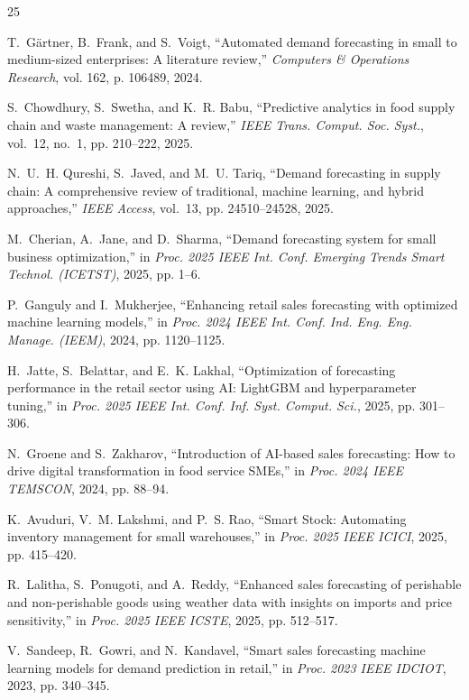 \documentclass[conference]{IEEEtran}
\begin{document}
\begin{thebibliography}{25}

T.~G{\"a}rtner, B.~Frank, and S.~Voigt, ``Automated demand forecasting in small to medium-sized enterprises: A literature review,'' \emph{Computers \& Operations Research}, vol. 162, p. 106489, 2024.

S.~Chowdhury, S.~Swetha, and K.~R. Babu, ``Predictive analytics in food supply chain and waste management: A review,'' \emph{IEEE Trans. Comput. Soc. Syst.}, vol.~12, no.~1, pp. 210--222, 2025.

N.~U.~H. Qureshi, S.~Javed, and M.~U. Tariq, ``Demand forecasting in supply chain: A comprehensive review of traditional, machine learning, and hybrid approaches,'' \emph{IEEE Access}, vol.~13, pp. 24510--24528, 2025.

M.~Cherian, A.~Jane, and D.~Sharma, ``Demand forecasting system for small business optimization,'' in \emph{Proc. 2025 IEEE Int. Conf. Emerging Trends Smart Technol. (ICETST)}, 2025, pp. 1--6.

P.~Ganguly and I.~Mukherjee, ``Enhancing retail sales forecasting with optimized machine learning models,'' in \emph{Proc. 2024 IEEE Int. Conf. Ind. Eng. Eng. Manage. (IEEM)}, 2024, pp. 1120--1125.

H.~Jatte, S.~Belattar, and E.~K. Lakhal, ``Optimization of forecasting performance in the retail sector using AI: LightGBM and hyperparameter tuning,'' in \emph{Proc. 2025 IEEE Int. Conf. Inf. Syst. Comput. Sci.}, 2025, pp. 301--306.

N.~Groene and S.~Zakharov, ``Introduction of AI-based sales forecasting: How to drive digital transformation in food service SMEs,'' in \emph{Proc. 2024 IEEE TEMSCON}, 2024, pp. 88--94.

K.~Avuduri, V.~M. Lakshmi, and P.~S. Rao, ``Smart Stock: Automating inventory management for small warehouses,'' in \emph{Proc. 2025 IEEE ICICI}, 2025, pp. 415--420.

R.~Lalitha, S.~Ponugoti, and A.~Reddy, ``Enhanced sales forecasting of perishable and non-perishable goods using weather data with insights on imports and price sensitivity,'' in \emph{Proc. 2025 IEEE ICSTE}, 2025, pp. 512--517.

V.~Sandeep, R.~Gowri, and N.~Kandavel, ``Smart sales forecasting machine learning models for demand prediction in retail,'' in \emph{Proc. 2023 IEEE IDCIOT}, 2023, pp. 340--345.


\end{thebibliography}
\end{document}

